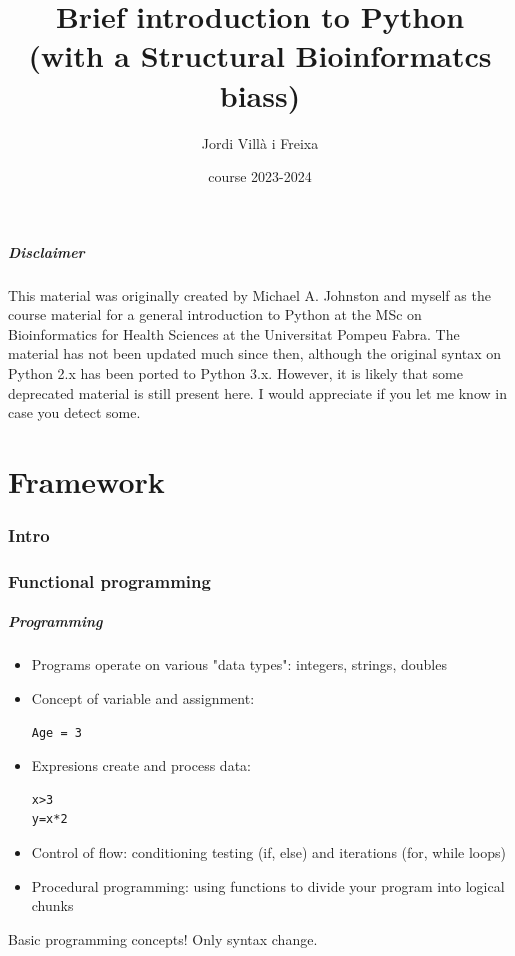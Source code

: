 \documentclass{beamer}
\title[Introduction]{Brief introduction to Python\\\small (with a Structural Bioinformatcs biass)} %
\author{Jordi Villà i Freixa} %
\institute[FCTE] %
{
Universitat de Vic - Universitat Central de Catalunya \\
Study Abroad\\ %
\medskip
\textit{jordi.villa@uvic.cat}\\ %
\copyright Michael A. Johnston 2007; JVF 2007-2023 
}
\date{course 2023-2024}
\begin{document}
\begin{frame}
  \titlepage %
\end{frame}

\begin{frame}
  \frametitle{Disclaimer}
  This material was originally created by Michael A. Johnston and myself as the course material for a general introduction to Python at the MSc on Bioinformatics for Health Sciences at the Universitat Pompeu Fabra. The material has not been updated much since then, although the original syntax on Python 2.x has been ported to Python 3.x. However, it is likely that some deprecated material is still present here. I would appreciate if you let me know in case you detect some. 
\end{frame}


\part{Framework}
\begin{frame}
\tableofcontents
\end{frame}

\section{Intro}
\section{Functional programming}

\begin{frame}[containsverbatim]
\frametitle{Programming}
\begin{itemize}
\item Programs operate on various "data types": integers, strings, doubles
\item Concept of variable and assignment: 
\begin{lstlisting}
Age = 3
\end{lstlisting}
\item Expresions create and process data:
\begin{lstlisting}
x>3
y=x*2
\end{lstlisting}
\item Control of flow: conditioning testing (if, else) and iterations (for, while loops)
\item Procedural programming: using functions to divide your program into logical chunks
\end{itemize}
Basic programming concepts! Only syntax change.
\end{frame}
\end{document}
